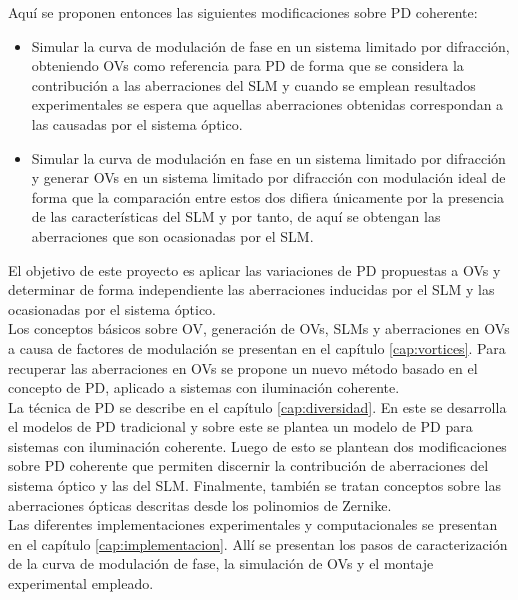Aquí se proponen entonces las siguientes modificaciones sobre PD coherente: 
\begin{itemize}
	\item Simular la curva de modulación de fase en un sistema limitado por difracción, obteniendo OVs como referencia para PD de forma que se considera la contribución a las aberraciones del SLM y cuando se emplean resultados experimentales se espera que aquellas aberraciones obtenidas correspondan a las causadas por el sistema óptico.
	\item Simular la curva de modulación en fase en un sistema limitado por difracción y generar OVs en un sistema limitado por difracción con modulación ideal de forma que la comparación entre estos dos difiera únicamente por la presencia de las características del SLM y por tanto, de aquí se obtengan las aberraciones que son ocasionadas por el SLM.
\end{itemize}

El objetivo de este proyecto es aplicar las variaciones de PD propuestas a OVs y determinar de forma independiente las aberraciones inducidas por el SLM y las ocasionadas por el sistema óptico.\\%

Los conceptos básicos sobre OV, generación de OVs, SLMs y aberraciones en OVs a causa de factores de modulación se presentan en el capítulo \ref{cap:vortices}. Para recuperar las aberraciones en OVs se propone un nuevo método basado en el concepto de PD, aplicado a sistemas con iluminación coherente.\\

La técnica de PD se describe en el capítulo \ref{cap:diversidad}. En este se desarrolla el modelos de PD tradicional y sobre este se plantea un modelo de PD para sistemas con iluminación coherente. Luego de esto se plantean dos modificaciones sobre PD coherente que permiten discernir la contribución de aberraciones del sistema óptico y las del SLM. Finalmente, también se tratan conceptos sobre las aberraciones ópticas descritas desde los polinomios de Zernike.\\

Las diferentes implementaciones experimentales y computacionales se presentan en el capítulo \ref{cap:implementacion}. Allí se presentan los pasos de caracterización de la curva de modulación de fase, la simulación de OVs y el montaje experimental empleado.\\

